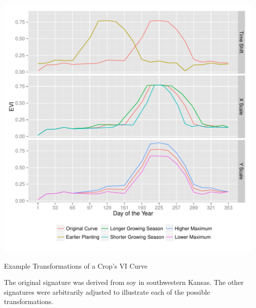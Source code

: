 \begin{ssfigure}
  \centering
  \includegraphics[width=\textwidth]{Graphics/transformations.pdf}
  \caption{Example Transformations of a Crop's VI Curve}
  \medskip
  \small
  The original signature was derived from soy in southwestern Kansas. The other signatures were arbitrarily adjusted to illustrate each of the possible transformations.
  \label{fig:transformations}
\end{ssfigure}


